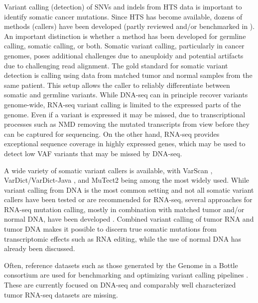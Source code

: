 \documentclass[11pt]{book}
\begin{document}
Variant calling (detection) of SNVs and indels from HTS data is important to identify somatic cancer mutations. Since HTS has become available, dozens of methods (callers) have been developed (partly reviewed and/or benchmarked in \cite{Roberts:2013, Xu:2014, Alioto:2015, Cai:2016, Kroigard:2016, Sandmann:2017, Bian:2018, Xu:2018, Chen:2020-varcall}). An important distinction is whether a method has been developed for germline calling, somatic calling, or both. Somatic variant calling, particularly in cancer genomes, poses additional challenges due to aneuploidy and potential artifacts due to challenging read alignment. The gold standard for somatic variant detection is calling using data from matched tumor and normal samples from the same patient. This setup allows the caller to reliably differentiate between somatic and germline variants. While DNA-seq can in principle recover variants genome-wide, RNA-seq variant calling is limited to the expressed parts of the genome. Even if a variant is expressed it may be missed, due to transcriptional processes such as NMD removing the mutated transcripts from view before they can be captured for sequencing. On the other hand, RNA-seq provides exceptional sequence coverage in highly expressed genes, which may be used to detect low VAF variants that may be missed by DNA-seq.

A wide variety of somatic variant callers is available, with VarScan \cite{Koboldt:2012}, VarDict/VarDict-Java \cite{Lai:2016}, and MuTect2 \cite{Benjamin:2019} being among the most widely used. While variant calling from DNA is the most common setting and not all somatic variant callers have been tested or are recommended for RNA-seq, several approaches for RNA-seq mutation calling, mostly in combination with matched tumor and/or normal DNA, have been developed \cite{Piskol:2013, Horvath:2013, Radenbaugh:2014, Wilkerson:2014, Sheng:2016, Guo:2017, Siegel:2018, Neums:2018}. Combined variant calling of tumor RNA and tumor DNA makes it possible to discern true somatic mutations from transcriptomic effects such as RNA editing, while the use of normal DNA has already been discussed.

Often, reference datasets such as those generated by the Genome in a Bottle consortium are used for benchmarking and optimizing variant calling pipelines \cite{Zook:2016, Chapman:2020}. These are currently focused on DNA-seq and comparably well characterized tumor RNA-seq datasets are missing.
\end{document}
